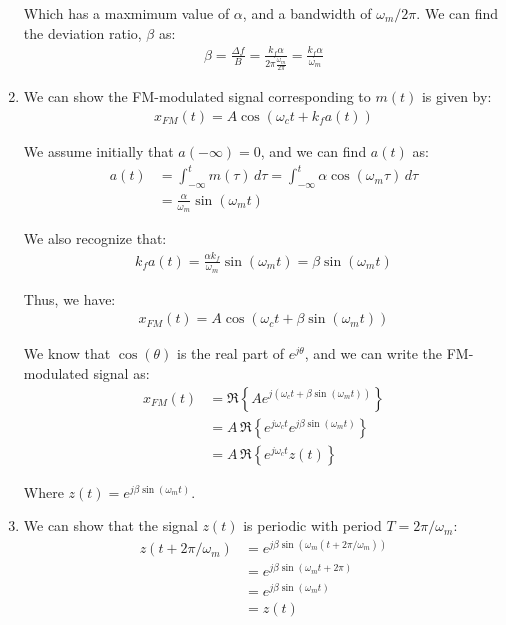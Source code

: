 \documentclass{article}
\begin{document}
\begin{enumerate}[label=1.\arabic*]
    Which has a maxmimum value of $\alpha$, and a bandwidth of $\omega_m / 2\pi$. We can find the deviation ratio, $\beta$ as:
    \begin{align*}
        \beta = \frac{\Delta f}{B} = \frac{k_f \alpha}{2\pi \frac{\omega_m}{2\pi}} = \frac{k_f \alpha}{\omega_m}
    \end{align*}

    \item We can show the FM-modulated signal corresponding to $m(t)$ is given by:
    \begin{align*}
        x_{FM}(t) = A \cos\left(\omega_c t + k_f a(t)\right)
    \end{align*}

    We assume initially that $a(-\infty) = 0$, and we can find $a(t)$ as:
    \begin{align*}
        a(t) &= \int_{-\infty}^{t} m(\tau) \, d\tau = \int_{-\infty}^{t} \alpha \cos(\omega_m \tau) \, d\tau \\
        &= \frac{\alpha}{\omega_m} \sin(\omega_m t)
    \end{align*}

    We also recognize that:
    \begin{align*}
        k_f a(t) = \frac{\alpha k_f}{\omega_m} \sin(\omega_m t) = \beta \sin(\omega_m t)
    \end{align*}

    Thus, we have:
    \begin{align*}
        x_{FM}(t) = A\cos\left(\omega_c t + \beta\sin(\omega_m t)\right)
    \end{align*}

    We know that $\cos(\theta)$ is the real part of $e^{j\theta}$, and we can write the FM-modulated signal as:
    \begin{align*}
        x_{FM}(t) &= \mathfrak{R} \left\{Ae^{j\left(\omega_c t + \beta\sin(\omega_m t)\right)}\right\} \\
        &= A \, \mathfrak{R}\left\{e^{j\omega_c t}e^{j\beta\sin(\omega_m t)}\right\} \\
        &= A \, \mathfrak{R}\left\{e^{j\omega_c t} z(t)\right\}
    \end{align*}

    Where $z(t) = e^{j\beta\sin(\omega_m t)}$.

    \item We can show that the signal $z(t)$ is periodic with period $T = 2\pi/\omega_m$:
    \begin{align*}
        z(t+2\pi/\omega_m) &= e^{j\beta\sin(\omega_m (t+2\pi/\omega_m))} \\
        &= e^{j\beta\sin(\omega_m t + 2\pi)} \\
        &= e^{j\beta\sin(\omega_m t)} \\
        &= z(t)
    \end{align*}


\end{enumerate}
\end{document}
